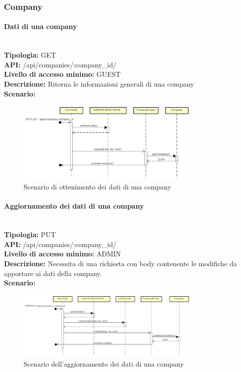 \newpage
\subsubsection{Company}
\paragraph{Dati di una company}\mbox{}\\
\textbf{Tipologia:} GET \\
\textbf{API:} /api/companies/:company\_id/ \\
\textbf{Livello di accesso minimo:} GUEST \\
\textbf{Descrizione:} Ritorna le informazioni generali di una company \\
\textbf{Scenario:} 
\begin{figure}[H]
\centering
\includegraphics[width=0.8\textwidth]{res/sections/backend/sequence/(GET)company.png}
\caption{Scenario di ottenimento dei dati di una company}
\end{figure}

\newpage
\paragraph{Aggiornamento dei dati di una company}\mbox{}\\
\textbf{Tipologia:} PUT \\
\textbf{API:} /api/companies/:company\_id/ \\
\textbf{Livello di accesso minimo:} ADMIN \\
\textbf{Descrizione:} Necessita di una richiesta con body contenente le modifiche da apportare ai dati della company. \\
\textbf{Scenario:} 
\begin{figure}[H]
\centering
\includegraphics[width=0.8\textwidth]{res/sections/backend/sequence/(PUT)company.png}
\caption{Scenario dell'aggiornamento dei dati di una company}
\end{figure}


